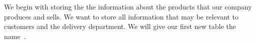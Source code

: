 %
\label{sec:factory:table:product}%
%
We begin with storing the the information about the products that our company produces and sells.
We want to store all information that may be relevant to customers and the delivery department.
We will give our first new table the name~.%
%
%
%
%
%
%
%
\FloatBarrier%
\endhsection%
%
